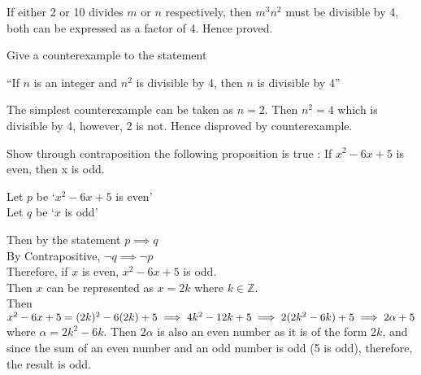 \documentclass[addpoints]{exam}
\newenvironment{problem}[2][Problem]{\begin{trivlist}
    \item[\hskip \labelsep {\bfseries #1}\hskip \labelsep {\bfseries #2.}]}{\end{trivlist}}
\begin{document}
\begin{sloppypar}
\begin{questions}
\begin{solution}
            If either 2 or 10 divides $m$ or $n$ respectively, then $m^3n^2$ must be divisible by 4, both can be expressed as a factor of 4. Hence proved. 
        \end{solution}
    \end{questions}

    \begin{problem}{7}
    Give a counterexample to the statement
    \begin{center}
        ``If $n$ is an integer and $n^2$ is divisible by 4, then $n$ is divisible by 4''
    \end{center}
    \end{problem}

    \begin{questions}
        \question
        \begin{solution}
            
            The simplest counterexample can be taken as $n = 2$. Then $n^2 = 4$ which is divisible by 4, however, 2 is not. Hence disproved by counterexample.
        \end{solution}
    \end{questions}

    \begin{problem}{8}
    Show through contraposition the following proposition is true : If $x^{2} - 6x + 5$ is even, then x is odd.
    \end{problem}

    \begin{questions}
        \question
        \begin{solution}
            
            Let $p$ be `$x^2 - 6x + 5$ is even' \\ 
            Let $q$ be `$x$ is odd'

            Then by the statement $ p \implies q $ \\ 
            By Contrapositive, $ \neg q \implies \neg p $ \\ 
            Therefore, if $x$ is even, $ x^2 -6x + 5 $ is odd. \\ 
            Then $x$ can be represented as $ x = 2k $ where $ k \in \mathbb{Z} $. \\ Then $x^2 - 6x + 5 = (2k)^2 - 6(2k) + 5 \\ 
            \implies 4k^2 -12k + 5 \\ \implies 2(2k^2 - 6k) + 5 \implies 2\alpha + 5$ where $ \alpha = 2k^2 - 6k $. Then $ 2\alpha $ is also an even number as it is of the form $ 2k $, and since the sum of an even number and an odd number is odd (5 is odd), therefore, the result is odd. 
            

\end{solution}
\end{questions}
\end{sloppypar}
\end{document}
